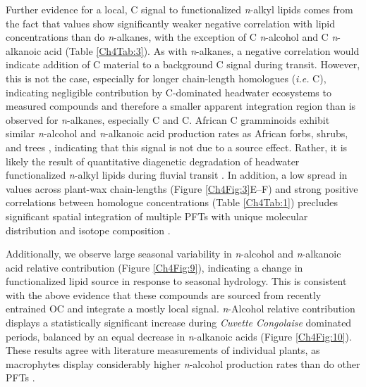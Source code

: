 Further evidence for a local, C signal to functionalized \textit{n}-alkyl lipids comes from the fact that  values show significantly weaker negative correlation with lipid concentrations than do \textit{n}-alkanes, with the exception of C \textit{n}-alcohol and C \textit{n}-alkanoic acid (Table \ref{Ch4Tab:3}). As with \textit{n}-alkanes, a negative correlation would indicate addition of C material to a background C signal during transit. However, this is not the case, especially for longer chain-length homologues (\textit{i.e.} C), indicating negligible contribution by C-dominated headwater ecosystems to measured compounds and therefore a smaller apparent integration region than is observed for \textit{n}-alkanes, especially C and C. African C gramminoids exhibit similar \textit{n}-alcohol and \textit{n}-alkanoic acid production rates as African forbs, shrubs, and trees \citep{Ali:2005ab,Rommerskirchen:2006gr,Vogts:2009fb}, indicating that this signal is not due to a source effect. Rather, it is likely the result of quantitative diagenetic degradation of headwater functionalized \textit{n}-alkyl lipids during fluvial transit \citep{Cranwell:1981vg,Meyers:1993vwa,Sun:1997wr,Hoefs:2002wu,vanDongen:2008kj}. In addition, a low spread in  values across plant-wax chain-lengths (Figure \ref{Ch4Fig:3}E--F) and strong positive correlations between homologue concentrations (Table \ref{Ch4Tab:1}) precludes significant spatial integration of multiple PFTs with unique molecular distribution and isotope composition \citep[\textit{c.f.}][]{Agrawal:2014fl}.

Additionally, we observe large seasonal variability in \textit{n}-alcohol and \textit{n}-alkanoic acid relative contribution (Figure \ref{Ch4Fig:9}), indicating a change in functionalized lipid source in response to seasonal hydrology. This is consistent with the above evidence that these compounds are sourced from recently entrained OC and integrate a mostly local signal. \textit{n}-Alcohol relative contribution displays a statistically significant increase during \textit{Cuvette Congolaise} dominated periods, balanced by an equal decrease in \textit{n}-alkanoic acids (Figure \ref{Ch4Fig:10}). These results agree with literature measurements of individual plants, as macrophytes display considerably higher \textit{n}-alcohol production rates than do other PFTs \citep{Ficken:1998vs,Ficken:2000wq,Bugalho:2004kj,Ali:2005ab,Ali:2005cr,Aichner:2010bk,Gao:2011dj,Diefendorf:2011hg,Wang:2012fb,Gao:2014bk}.

